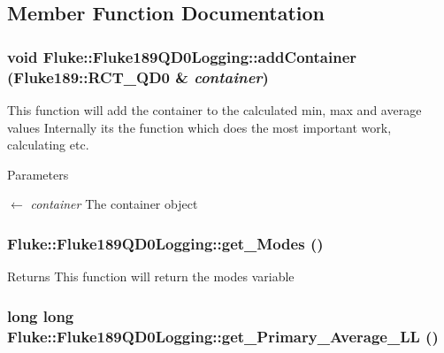 \subsection{Member Function Documentation}
\hypertarget{classFluke_1_1Fluke189QD0Logging_af06d4058c124e5b13893311145d529d2}{
\subsubsection[{addContainer}]{\setlength{\rightskip}{0pt plus 5cm}void Fluke::Fluke189QD0Logging::addContainer ({\bf Fluke189::RCT\_\-QD0} \& {\em container})}}
\label{classFluke_1_1Fluke189QD0Logging_af06d4058c124e5b13893311145d529d2}
This function will add the container to the calculated min, max and average values Internally its the function which does the most important work, calculating etc. 
\begin{DoxyParams}{Parameters}
\item[\mbox{$\leftarrow$} {\em container}]The container object \end{DoxyParams}
\hypertarget{classFluke_1_1Fluke189QD0Logging_a334633daaf140e8d49655e65ecd382e3}{
\subsubsection[{get\_\-Modes}]{ Fluke::Fluke189QD0Logging::get\_\-Modes ()}}
\label{classFluke_1_1Fluke189QD0Logging_a334633daaf140e8d49655e65ecd382e3}
\begin{DoxyReturn}{Returns}
This function will return the modes variable 
\end{DoxyReturn}
\hypertarget{classFluke_1_1Fluke189QD0Logging_a29473a5a7d016d020f0948fcf3e31e50}{
\subsubsection[{get\_\-Primary\_\-Average\_\-LL}]{\setlength{\rightskip}{0pt plus 5cm}long long Fluke::Fluke189QD0Logging::get\_\-Primary\_\-Average\_\-LL ()}}
